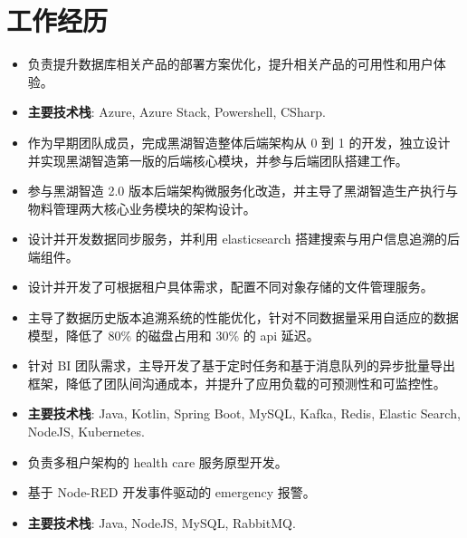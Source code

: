 \documentclass{resume}
\begin{document}


\section{工作经历}
\begin{itemize}
  \item 负责提升数据库相关产品的部署方案优化，提升相关产品的可用性和用户体验。
  \item \textbf{主要技术栈}: Azure, Azure Stack, Powershell, CSharp.
\end{itemize}

\begin{itemize}
  \item 作为早期团队成员，完成黑湖智造整体后端架构从 0 到 1 的开发，独立设计并实现黑湖智造第一版的后端核心模块，并参与后端团队搭建工作。
  \item 参与黑湖智造 2.0 版本后端架构微服务化改造，并主导了黑湖智造生产执行与物料管理两大核心业务模块的架构设计。
  \item 设计并开发数据同步服务，并利用 elasticsearch 搭建搜索与用户信息追溯的后端组件。
  \item 设计并开发了可根据租户具体需求，配置不同对象存储的文件管理服务。
  \item 主导了数据历史版本追溯系统的性能优化，针对不同数据量采用自适应的数据模型，降低了 80\% 的磁盘占用和 30\% 的 api 延迟。
  \item 针对 BI 团队需求，主导开发了基于定时任务和基于消息队列的异步批量导出框架，降低了团队间沟通成本，并提升了应用负载的可预测性和可监控性。
  \item \textbf{主要技术栈}: Java, Kotlin, Spring Boot, MySQL, Kafka, Redis, Elastic Search, NodeJS, Kubernetes.
\end{itemize}

\begin{itemize}
  \item 负责多租户架构的 health care 服务原型开发。
  \item 基于 Node-RED 开发事件驱动的 emergency 报警。
  \item \textbf{主要技术栈}: Java, NodeJS, MySQL, RabbitMQ.
\end{itemize}
\end{document}
